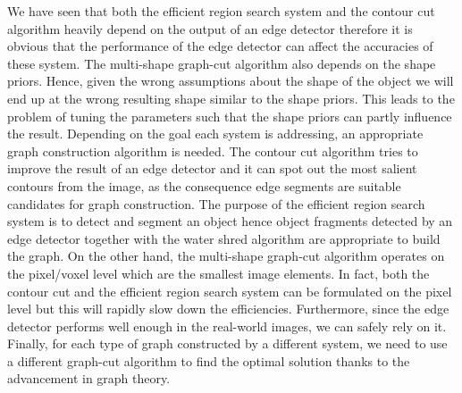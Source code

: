 \documentclass{SMBV12}
\begin{document}
We have seen that both the efficient region search system and the contour cut algorithm heavily depend on the output of an edge detector therefore it is obvious that the performance of the edge detector can affect the accuracies of these system. The multi-shape graph-cut algorithm also depends on the shape priors. Hence, given the wrong assumptions about the shape of the object we will end up at the wrong resulting shape similar to the shape priors. This leads to the problem of tuning the parameters such that the shape priors can partly influence the result. Depending on the goal each system is addressing, an appropriate graph construction algorithm is needed. The contour cut algorithm tries to improve the result of an edge detector and it can spot out the most salient contours from the image, as the consequence edge segments are suitable candidates for graph construction. The purpose of the efficient region search system is to detect and segment an object hence object fragments detected by an edge detector together with the water shred algorithm are appropriate to build the graph. On the other hand, the multi-shape graph-cut algorithm operates on the pixel/voxel level which are the smallest image elements. In fact, both the contour cut and the efficient region search system can be formulated on the pixel level but this will rapidly slow down the efficiencies. Furthermore, since the edge detector performs well enough in the real-world images, we can safely rely on it. Finally, for each type of graph constructed by a different system, we need to use a different graph-cut algorithm to find the optimal solution thanks to the advancement in graph theory.

%
\def\refname{Literature}





\end{document}

